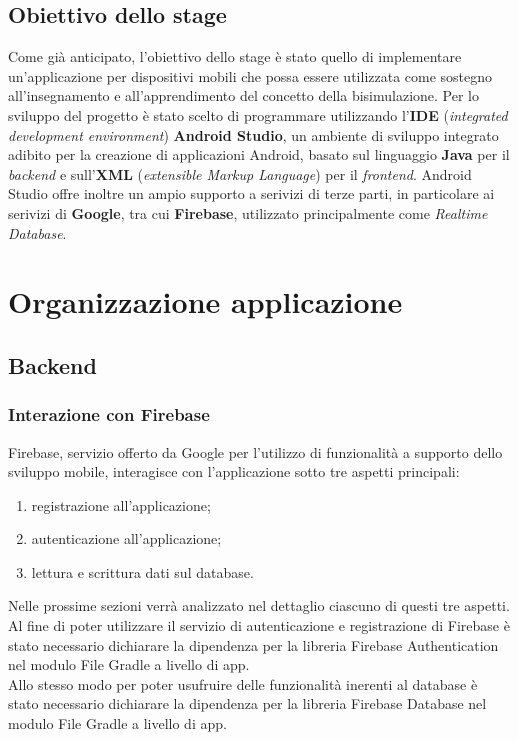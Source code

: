 \documentclass[a4paper,12pt,twoside,openright]{report}
\begin{document}
\section{Obiettivo dello stage}
Come già anticipato, l'obiettivo dello stage è stato quello di implementare un'applicazione per dispositivi mobili che possa essere utilizzata come sostegno all'insegnamento e all'apprendimento del concetto della bisimulazione. Per lo sviluppo del progetto è stato scelto di programmare utilizzando l'\textbf{IDE} (\textit{integrated development environment})  \textbf{Android Studio}, un ambiente di sviluppo integrato adibito per la creazione di applicazioni Android, basato sul linguaggio \textbf{Java} per il \textit{backend} e sull'\textbf{XML} (\textit{extensible Markup Language}) per il \textit{frontend}. Android Studio offre inoltre un ampio supporto a serivizi di terze parti, in particolare ai serivizi di \textbf{Google}, tra cui \textbf{Firebase}, utilizzato principalmente come \textit{Realtime Database}.

\chapter{Organizzazione applicazione}
\section{Backend}
\subsection{Interazione con Firebase}
Firebase, servizio offerto da Google per l'utilizzo di funzionalità a supporto dello sviluppo mobile, interagisce con l'applicazione sotto tre aspetti principali:

\begin{enumerate}
\item registrazione all'applicazione;

\item autenticazione all'applicazione;

\item lettura e scrittura dati sul database.
\end{enumerate}

Nelle prossime sezioni verrà analizzato nel dettaglio ciascuno di questi tre aspetti.\\
Al fine di poter utilizzare il servizio di autenticazione e registrazione di Firebase è stato necessario dichiarare la dipendenza per la libreria Firebase Authentication nel modulo File Gradle a livello di app.\\
Allo stesso modo per poter usufruire delle funzionalità inerenti al database è stato necessario dichiarare la dipendenza per la libreria Firebase Database nel modulo File Gradle a livello di app.
\end{document}
